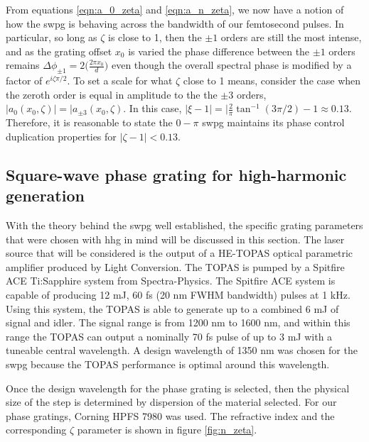 From equations \ref{eqn:a_0_zeta} and \ref{eqn:a_n_zeta}, we now have a notion of how the \gls{swpg} is behaving across the bandwidth of our femtosecond pulses.  In particular, so long as $\zeta$ is close to 1, then the $\pm1$ orders are still the most intense, and as the grating offset $x_0$ is varied the phase difference between the $\pm1$ orders remains $\Delta\phi_{\pm1}=2\bigg(\frac{2\pi x_0}{d}\bigg)$ even though the overall spectral phase is modified by a factor of $e^{i\zeta\pi/2}$.  To set a scale for what $\zeta$ close to 1 means, consider the case when the zeroth order is equal in amplitude to the the $\pm3$ orders, $\rvert a_0(x_0,\zeta)\rvert = \rvert a_{\pm3}(x_0,\zeta)$.  In this case, $\rvert \xi - 1\rvert=\rvert\frac{2}{\pi}\tan^{-1}(3\pi/2)-1\approx0.13$.  Therefore, it is reasonable to state the $0-\pi$ \gls{swpg} maintains its phase control duplication properties for $\rvert\zeta - 1\rvert<0.13$.

\subsection{Square-wave phase grating for high-harmonic generation}
With the theory behind the \gls{swpg} well established, the specific grating parameters that were chosen with \gls{hhg} in mind will be discussed in this section.  The laser source that will be considered is the output of a HE-TOPAS optical parametric amplifier produced by Light Conversion.  The TOPAS is pumped by a Spitfire ACE Ti:Sapphire system from Spectra-Physics.  The Spitfire ACE system is capable of producing  12 mJ, 60 fs (20 nm FWHM bandwidth) pulses at 1 kHz.  Using this system, the TOPAS is able to generate up to a combined 6 mJ of signal and idler. The signal range is from 1200 nm to 1600 nm, and within this range the TOPAS can output a nominally 70 fs pulse of up to 3 mJ with a tuneable central wavelength.  A design wavelength of 1350 nm was chosen for the \gls{swpg} because the TOPAS performance is optimal around this wavelength.

Once the design wavelength for the phase grating is selected, then the physical size of the step is determined by dispersion of the material selected.  For our phase gratings, Corning HPFS 7980 was used.  The refractive index and the corresponding $\zeta$ parameter is shown in figure \ref{fig:n_zeta}.

